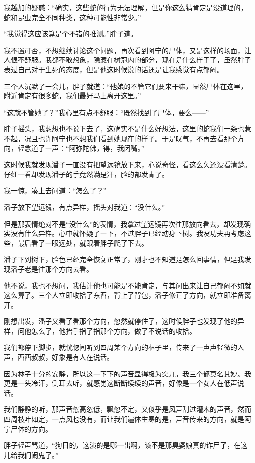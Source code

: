 我越加的疑惑：“确实，这些蛇的行为无法理解，但是你这么猜肯定是没道理的，蛇和昆虫完全不同种类，这种可能性非常少。”

“我觉得这应该算是个不错的推测。”胖子道。

我不置可否，不想继续讨论这个问题，再次看到阿宁的尸体，又是这样的场面，让人很不舒服。我都不敢想象，隐藏在树冠内的部分，现在是什么样子了，虽然胖子表过自己对于生死的态度，但是他这时候说的话还是让我感觉有点郁闷。

三个人沉默了一会儿，胖子就道：“他娘的不管它们要来干嘛，显然尸体在这里，附近肯定有很多蛇，我们最好马上离开这里。”

“这就不管她了？”我心里有点不舒服：“既然找到了尸体，要么——”

胖子摇头，我想想也不说下去了，这确实不是什么好想法，这里的蛇我们一条也惹不起，况且也许阿宁也不想我们看到她现在的样子。于是叹气，不再去看那个方向，轻念道了一声：“阿弥陀佛，得，我闭嘴。”

这时候我就发现潘子一直没有把望远镜放下来，心说奇怪，看这么久还没看清楚。仔细一看却发现潘子的手竟然满是汗，脸的都发青了。

我一惊，凑上去问道：“怎么了？”

潘子放下望远镜，有点异样，摇头对我道：“没什么。”

但是那表情绝对不是“没什么”的表情，我拿过望远镜再次往那放向看去，却发现确实没有什么异样。心中就怀疑了一下，不过胖子已经动身下树。我没功夫再考虑这些，最后看了一眼远处，就跟着胖子爬了下去。

潘子下到树下，脸色已经完全恢复正常了，刚才也不知道是怎么回事情，但是我发现潘子老是往那个方向去看。

他不说，我也不想问，我估计他也可能是不能肯定，与其问出来让自己郁闷不如就这么算了。三个人立即收拾了东西，背上了背包，潘子修正了方向，就立即准备离开。

刚想出发，潘子又看了看那个方向，忽然就停住了，这时候胖子也发现了他的异样，问他怎么了，他抬手指了指那个方向，做了不说话的收拾。

我们都停下脚步，就恍惚间听到四周某个方向的林子里，传来了一声声轻微的人声，西西叔叔，好象是有人在说话。

因为林子十分的安静，所以这一下下的声音显得极为突兀，我三个都莫名其妙。我更是一头冷汗，侧耳去听，就感觉这断断续续的声音，好像是一个女人在低声说话。

我们静静的听，那声音忽高忽低，飘忽不定，又似乎是风声刮过灌木的声音，然而四周枝叶如定，一点风也没有，而让我们遍体生寒的是，声音传来的方向，就是阿宁尸体的方向。

胖子轻声骂道，“狗日的，这演的是哪一出啊，该不是那臭婆娘真的诈尸了，在这儿给我们闹鬼了。”

